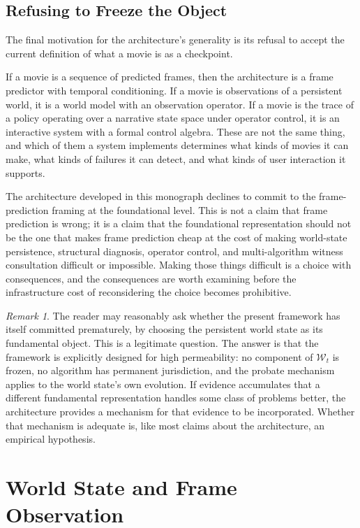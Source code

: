 \documentclass[11pt,a4paper]{article}
\theoremstyle{plain}
\theoremstyle{definition}
\theoremstyle{remark}
\newtheorem{remark}[theorem]{Remark}
\begin{document}
\subsection{Refusing to Freeze the Object}

The final motivation for the architecture's generality is its refusal to accept the current definition of what a movie is as a checkpoint.

If a movie is a sequence of predicted frames, then the architecture is a frame predictor with temporal conditioning. If a movie is observations of a persistent world, it is a world model with an observation operator. If a movie is the trace of a policy operating over a narrative state space under operator control, it is an interactive system with a formal control algebra. These are not the same thing, and which of them a system implements determines what kinds of movies it can make, what kinds of failures it can detect, and what kinds of user interaction it supports.

The architecture developed in this monograph declines to commit to the frame-prediction framing at the foundational level. This is not a claim that frame prediction is wrong; it is a claim that the foundational representation should not be the one that makes frame prediction cheap at the cost of making world-state persistence, structural diagnosis, operator control, and multi-algorithm witness consultation difficult or impossible. Making those things difficult is a choice with consequences, and the consequences are worth examining before the infrastructure cost of reconsidering the choice becomes prohibitive.

\begin{remark}
The reader may reasonably ask whether the present framework has itself committed prematurely, by choosing the persistent world state as its fundamental object. This is a legitimate question. The answer is that the framework is explicitly designed for high permeability: no component of $\mathcal{W}_t$ is frozen, no algorithm has permanent jurisdiction, and the probate mechanism applies to the world state's own evolution. If evidence accumulates that a different fundamental representation handles some class of problems better, the architecture provides a mechanism for that evidence to be incorporated. Whether that mechanism is adequate is, like most claims about the architecture, an empirical hypothesis.
\end{remark}

\section{World State and Frame Observation}
\label{sec:worldstate}
\end{document}
